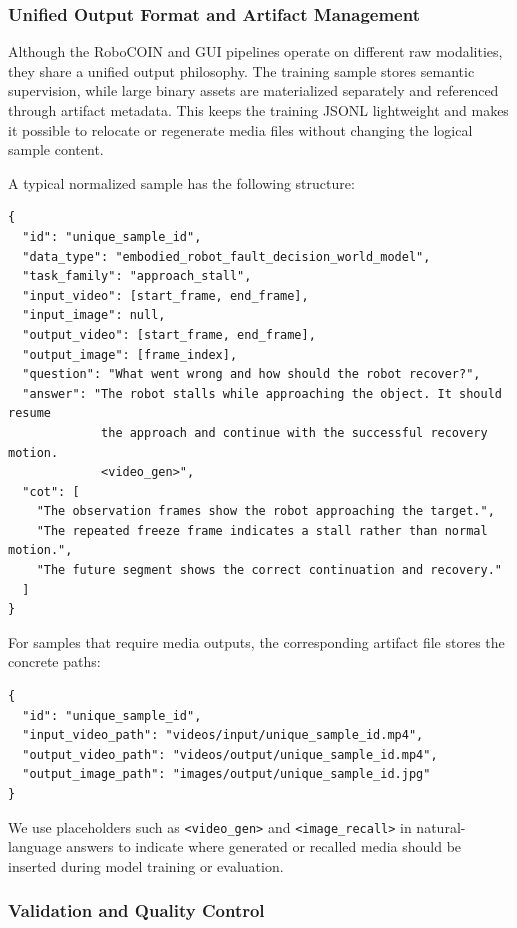 \subsubsection{Unified Output Format and Artifact Management}
\label{app:unified_output}

Although the RoboCOIN and GUI pipelines operate on different raw modalities, they share a unified output philosophy. The training sample stores semantic supervision, while large binary assets are materialized separately and referenced through artifact metadata. This keeps the training JSONL lightweight and makes it possible to relocate or regenerate media files without changing the logical sample content.

A typical normalized sample has the following structure:
\begin{verbatim}
{
  "id": "unique_sample_id",
  "data_type": "embodied_robot_fault_decision_world_model",
  "task_family": "approach_stall",
  "input_video": [start_frame, end_frame],
  "input_image": null,
  "output_video": [start_frame, end_frame],
  "output_image": [frame_index],
  "question": "What went wrong and how should the robot recover?",
  "answer": "The robot stalls while approaching the object. It should resume
             the approach and continue with the successful recovery motion.
             <video_gen>",
  "cot": [
    "The observation frames show the robot approaching the target.",
    "The repeated freeze frame indicates a stall rather than normal motion.",
    "The future segment shows the correct continuation and recovery."
  ]
}
\end{verbatim}

For samples that require media outputs, the corresponding artifact file stores the concrete paths:
\begin{verbatim}
{
  "id": "unique_sample_id",
  "input_video_path": "videos/input/unique_sample_id.mp4",
  "output_video_path": "videos/output/unique_sample_id.mp4",
  "output_image_path": "images/output/unique_sample_id.jpg"
}
\end{verbatim}

We use placeholders such as \texttt{<video\_gen>} and \texttt{<image\_recall>} in natural-language answers to indicate where generated or recalled media should be inserted during model training or evaluation.

\subsubsection{Validation and Quality Control}
\label{app:pipeline_validation}

